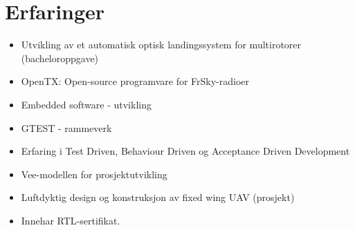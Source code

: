\documentclass[]{friggeri-cv}
\begin{document}
\section{Erfaringer}
\begin{itemize}
    \item Utvikling av et automatisk optisk landingssystem for multirotorer (bacheloroppgave)
    \item OpenTX: Open-source programvare for FrSky-radioer
    \item Embedded software - utvikling
    \item GTEST - rammeverk 
    \item Erfaring i Test Driven, Behaviour Driven og Acceptance Driven Development
    \item Vee-modellen for prosjektutvikling
    \item Luftdyktig design og konstruksjon av fixed wing UAV (prosjekt)
    \item Innehar RTL-sertifikat.

	
\end{itemize}
\end{document}
